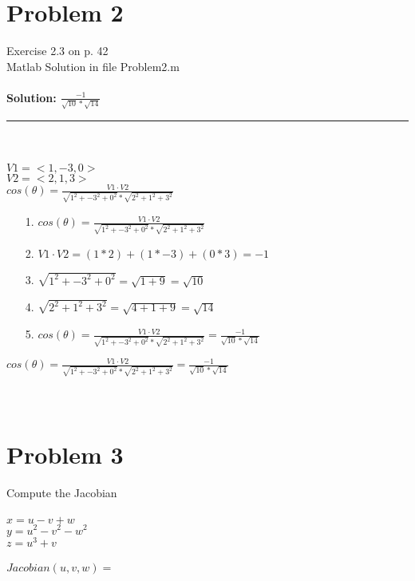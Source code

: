 \documentclass[12pt]{article}
\begin{document}
\section{Problem 2}	
Exercise 2.3 on p. 42\\ 
Matlab Solution in file Problem2.m\\ \\
\textbf{Solution: {\LARGE $ \frac{-1}{\sqrt{10} * \sqrt{14}}$ }}\\

\noindent\rule{22cm}{0.4pt}
\\ \\
$V1 = <1, -3, 0> $\\
$V2 = <2, 1, 3> $\\

{\Large$cos(\theta) = \frac{ V1 \cdot V2}{\sqrt{1^2 + -3^2 + 0^2} * \sqrt{2^2 + 1^2 + 3^2}}$ }\\

\begin{enumerate}
\item[1. ] $cos(\theta) = \frac{ V1 \cdot V2}{\sqrt{1^2 + -3^2 + 0^2} * \sqrt{2^2 + 1^2 + 3^2}}$ 
\item[2. ] $V1 \cdot V2 = (1 * 2) + (1 * -3) + (0 * 3) = -1 $
\item[3. ] $\sqrt{1^2 + -3^2 + 0^2} = \sqrt{1 + 9} = \sqrt{10} $
\item[4. ] $ \sqrt{2^2 + 1^2 + 3^2} = \sqrt{4 + 1 + 9} = \sqrt{14}$
\item[5. ] $cos(\theta) = \frac{ V1 \cdot V2}{\sqrt{1^2 + -3^2 + 0^2} * \sqrt{2^2 + 1^2 + 3^2}} = \frac{-1}{\sqrt{10} * \sqrt{14}}$  
\end{enumerate}

{\LARGE $cos(\theta) = \frac{ V1 \cdot V2}{\sqrt{1^2 + -3^2 + 0^2} * \sqrt{2^2 + 1^2 + 3^2}} = \frac{-1}{\sqrt{10} * \sqrt{14}}$ }\\
\\ \\

\section{Problem 3}
Compute the Jacobian\\ \\
$x = u - v + w$\\
$y = u^2 - v^2 - w^2$\\
$z = u^3 + v$\\
\\
$Jacobian(u, v, w) = $\\
\end{document}
